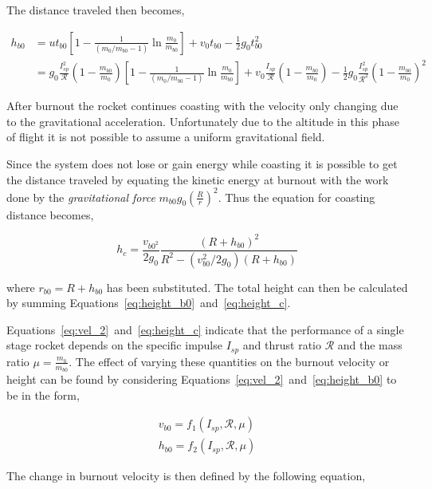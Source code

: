 The distance traveled then becomes,

\begin{align}
    \label{eq:height_b0}
    h_{b0}&=ut_{b0}\left [ 1 - \frac{1}{(m_0/m_{b0}-1)} \ln{\frac{m_0}{m_{b0}}}\right] + v_0t_{b0} - \frac{1}{2} g_0t_{b0}^2 \\
    &= g_0\frac{I_{sp}^2}{\mathscr{R}} \left ( 1 - \frac{m_{b0}}{m_0} \right ) \left [ 1 - \frac{1}{(m_0/m_{b0}-1)} \ln{\frac{m_0}{m_{b0}}}\right] 
    + v_0\frac{I_{sp}}{\mathscr{R}} \left ( 1 - \frac{m_{b0}}{m_0} \right ) 
    - \frac{1}{2} g_0\frac{I_{sp}^2}{\mathscr{R}^2} \left ( 1 - \frac{m_{b0}}{m_0} \right )^2
\end{align}

After burnout the rocket continues coasting with the velocity only changing due to the gravitational acceleration. Unfortunately due to the altitude in this phase of flight it is not possible to assume a uniform gravitational field. 

Since the system does not lose or gain energy while coasting it is possible to get the distance traveled by equating the kinetic energy at burnout with the work done by the \emph{gravitational force} $m_{b0}g_0\left ( \frac{R}{r} \right )^2$. Thus the equation for coasting distance becomes,

\begin{equation}
    \label{eq:height_c}
    h_c = \frac{v_{b0^2}}{2g_0} \frac{\left ( R+h_{b0} \right )^2}
    {R^2 - \left(v_{b0}^2/2g_0 \right) \left ( R+h_{b0} \right )}
\end{equation}

where $r_{b0}=R+h_{b0}$ has been substituted. The total height can then be calculated by summing Equations~\eqref{eq:height_b0}~and~\eqref{eq:height_c}.

Equations~\eqref{eq:vel_2}~and~\eqref{eq:height_c} indicate that the performance of a single stage rocket depends on the specific impulse $I_{sp}$ and thrust ratio $\mathscr{R}$ and the mass ratio $\mu=\frac{m_0}{m_{b0}}$. The effect of varying these quantities on the burnout velocity or height can be found by considering Equations~\eqref{eq:vel_2}~and~\eqref{eq:height_b0} to be in the form,

\begin{align}
    v_{b0} = f_1\left(I_{sp}, \mathscr{R}, \mu\right) \\
    h_{b0} = f_2\left(I_{sp}, \mathscr{R}, \mu\right)
\end{align}


The change in burnout velocity is then defined by the following equation,

